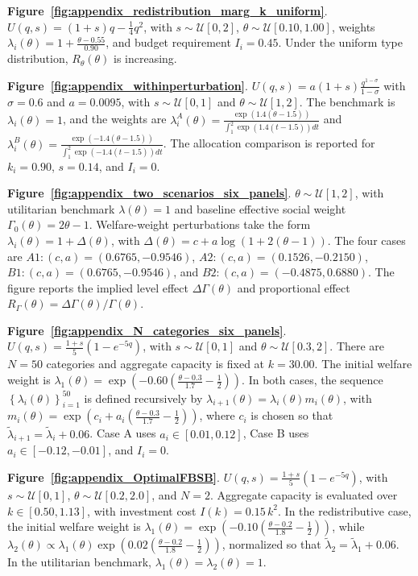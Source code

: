 \documentclass{class}
\begin{document}
\noindent \textbf{Figure~\ref{fig:appendix_redistribution_marg_k_uniform}}.
\(U(q,s)=(1+s)q-\frac{1}{4}q^2\), with \(s\sim\mathcal U[0,2]\), \(\theta\sim\mathcal U[0.10,1.00]\), weights \(\lambda_i(\theta)=1+\frac{\theta-0.55}{0.90}\), and budget requirement \(I_i=0.45\). Under the uniform type distribution, \(R_\theta(\theta)\) is increasing.

\noindent\textbf{Figure~\ref{fig:appendix_withinperturbation}}.
\(U(q,s)=a(1+s)\frac{q^{1-\sigma}}{1-\sigma}\) with \(\sigma=0.6\) and \(a=0.0095\), with \(s\sim\mathcal U[0,1]\) and \(\theta\sim\mathcal U[1,2]\). The benchmark is \(\lambda_i(\theta)=1\), and the weights are \(\lambda_i^{A}(\theta)=\frac{\exp\!\left(1.4(\theta-1.5)\right)}{\int_{1}^{2}\exp\!\left(1.4(t-1.5)\right)dt}\) and \(\lambda_i^{B}(\theta)=\frac{\exp\!\left(-1.4(\theta-1.5)\right)}{\int_{1}^{2}\exp\!\left(-1.4(t-1.5)\right)dt}\). The allocation comparison is reported for \(k_i=0.90\), \(s=0.14\), and \(I_i=0\).

\noindent\textbf{Figure~\ref{fig:appendix_two_scenarios_six_panels}}.
\(\theta\sim\mathcal U[1,2]\), with utilitarian benchmark \(\lambda(\theta)=1\) and baseline effective social weight \(\Gamma_0(\theta)=2\theta-1\). Welfare-weight perturbations take the form \(\lambda_i(\theta)=1+\Delta(\theta)\), with \(\Delta(\theta)=c+a\log\!\left(1+2(\theta-1)\right)\). The four cases are \(A1:(c,a)=(0.6765,-0.9546)\), \(A2:(c,a)=(0.1526,-0.2150)\), \(B1:(c,a)=(0.6765,-0.9546)\), and \(B2:(c,a)=(-0.4875,0.6880)\). The figure reports the implied level effect \(\Delta\Gamma(\theta)\) and proportional effect \(R_{\Gamma}(\theta)=\Delta\Gamma(\theta)/\Gamma(\theta)\).

\noindent\textbf{Figure~\ref{fig:appendix_N_categories_six_panels}}.
\(U(q,s)=\frac{1+s}{5}\left(1-e^{-5q}\right)\), with \(s\sim\mathcal U[0,1]\) and \(\theta\sim\mathcal U[0.3,2]\). There are \(N=50\) categories and aggregate capacity is fixed at \(k=30.00\). The initial welfare weight is \(\lambda_1(\theta)=\exp\!\left(-0.60\left(\frac{\theta-0.3}{1.7}-\frac{1}{2}\right)\right)\). In both cases, the sequence \(\left\{\lambda_i(\theta)\right\}_{i=1}^{50}\) is defined recursively by \(\lambda_{i+1}(\theta)=\lambda_i(\theta)m_i(\theta)\), with \(m_i(\theta)=\exp\!\left(c_i+a_i\left(\frac{\theta-0.3}{1.7}-\frac{1}{2}\right)\right)\), where \(c_i\) is chosen so that \(\tilde\lambda_{i+1}=\tilde\lambda_i+0.06\). Case A uses \(a_i\in[0.01,0.12]\), Case B uses \(a_i\in[-0.12,-0.01]\), and \(I_i=0\).

\noindent\textbf{Figure~\ref{fig:appendix_OptimalFBSB}}.
\(U(q,s)=\frac{1+s}{5}\left(1-e^{-5q}\right)\), with \(s\sim\mathcal U[0,1]\), \(\theta\sim\mathcal U[0.2,2.0]\), and \(N=2\). Aggregate capacity is evaluated over \(k\in[0.50,1.13]\), with investment cost \(I(k)=0.15\,k^2\). In the redistributive case, the initial welfare weight is \(\lambda_1(\theta)=\exp\!\left(-0.10\left(\frac{\theta-0.2}{1.8}-\frac{1}{2}\right)\right)\), while \(\lambda_2(\theta)\propto \lambda_1(\theta)\exp\!\left(0.02\left(\frac{\theta-0.2}{1.8}-\frac{1}{2}\right)\right)\), normalized so that \(\tilde\lambda_2=\tilde\lambda_1+0.06\). In the utilitarian benchmark, \(\lambda_1(\theta)=\lambda_2(\theta)=1\).
\end{document}
